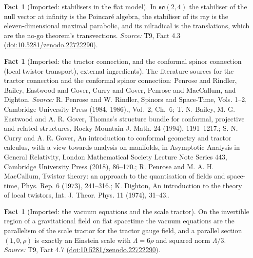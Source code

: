 \documentclass[11pt]{article}
\theoremstyle{definition}
\newtheorem{fact}[theorem]{Fact}
\theoremstyle{plain}
\begin{document}
\begin{fact}[Imported: stabilisers in the flat model]\label{c:correspondence.imported-stabilisers-flat-model}
In $\mathfrak{so}(2,4)$ the stabiliser of the null vector at infinity is the Poincar\'e algebra, the stabiliser of its ray is the eleven-dimensional maximal parabolic, and its nilradical is the translations, which are the no-go theorem's transvections.
\emph{Source:} T9, Fact 4.3 (\href{https://doi.org/10.5281/zenodo.22722290}{doi:10.5281/zenodo.22722290}).
\end{fact}

\begin{fact}[Imported: the tractor connection, and the conformal spinor connection (local twistor transport), external ingredients]\label{c:correspondence.imported-tractor-connection-local-twistor-transport-external}
The literature sources for the tractor connection and the conformal spinor connection: Penrose and Rindler, Bailey, Eastwood and Gover, Curry and Gover, Penrose and MacCallum, and Dighton.
\emph{Source:} R. Penrose and W. Rindler, Spinors and Space-Time, Vols. 1--2, Cambridge University Press (1984, 1986)., Vol.~2, Ch.~6; T. N. Bailey, M. G. Eastwood and A. R. Gover, Thomas's structure bundle for conformal, projective and related structures, Rocky Mountain J. Math. 24 (1994), 1191--1217.; S. N. Curry and A. R. Gover, An introduction to conformal geometry and tractor calculus, with a view towards analysis on manifolds, in Asymptotic Analysis in General Relativity, London Mathematical Society Lecture Note Series 443, Cambridge University Press (2018), 86--170.; R. Penrose and M. A. H. MacCallum, Twistor theory: an approach to the quantisation of fields and space-time, Phys. Rep. 6 (1973), 241--316.; K. Dighton, An introduction to the theory of local twistors, Int. J. Theor. Phys. 11 (1974), 31--43..
\end{fact}

\begin{fact}[Imported: the vacuum equations and the scale tractor]\label{c:correspondence.imported-vacuum-equations-scale-tractor}
On the invertible region of a gravitational field on flat spacetime the vacuum equations are the parallelism of the scale tractor for the tractor gauge field, and a parallel section $(1, 0, \rho)$ is exactly an Einstein scale with $\Lambda = 6\rho$ and squared norm $\Lambda/3$.
\emph{Source:} T9, Fact 4.7 (\href{https://doi.org/10.5281/zenodo.22722290}{doi:10.5281/zenodo.22722290}).
\end{fact}
\end{document}
